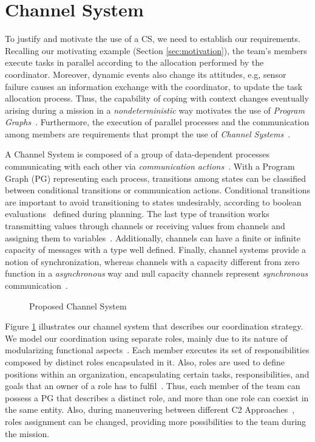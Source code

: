 \section{Channel System}
\label{sec:channelSystem}

To justify and motivate the use of a CS, we need to establish our requirements. Recalling our motivating example (Section \ref{sec:motivation}), the team's members execute tasks in parallel according to the allocation performed by the coordinator. Moreover, dynamic events also change its attitudes, e.g, sensor failure causes an information exchange with the coordinator, to update the task allocation process. Thus, the capability of coping with context changes eventually arising during a mission in a \textit{nondeterministic} way motivates the use of \textit{Program Graphs}~\cite{modelcheckingBaier}. Furthermore, the execution of parallel processes and the communication among members are requirements that prompt the use of \textit{Channel Systems}~\cite{modelcheckingBaier}.

A Channel System is composed of a group of data-dependent processes communicating with each other via \textit{communication actions}~\cite{modelcheckingBaier}. With a Program Graph (PG) representing each process, transitions among states can be classified between conditional transitions or communication actions. Conditional transitions are important to avoid transitioning to states undesirably, according to boolean evaluations~\cite{modelcheckingBaier} defined during planning. The last type of transition works transmitting values through channels or receiving values from channels and assigning them to variables~\cite{modelcheckingBaier}. Additionally, channels can have a finite or infinite capacity of messages with a type well defined. Finally, channel systems provide a notion of synchronization, whereas channels with a capacity different from zero function in a \textit{asynchronous} way and null capacity channels represent \textit{synchronous} communication~\cite{modelcheckingBaier}.

\begin{figure}[!ht]
    \centering
    \scalebox{.75}{}
    \caption{Proposed Channel System}
    \label{fig:CS}
\end{figure}

Figure \ref{fig:CS} illustrates our channel system that describes our coordination strategy. We model our coordination using separate roles, mainly due to its nature of modularizing functional aspects~\cite{roleOrientedModeling}. Each member executes its set of responsibilities composed by distinct roles encapsulated in it. Also, roles are used to define positions within an organization, encapsulating certain tasks, responsibilities, and goals that an owner of a role has to fulfil~\cite{roleOrientedModeling}. Thus, each member of the team can possess a PG that describes a distinct role, and more than one role can coexist in the same entity. Also, during maneuvering between different C2 Approaches~\cite{france2014}, roles assignment can be changed, providing more possibilities to the team during the mission.

